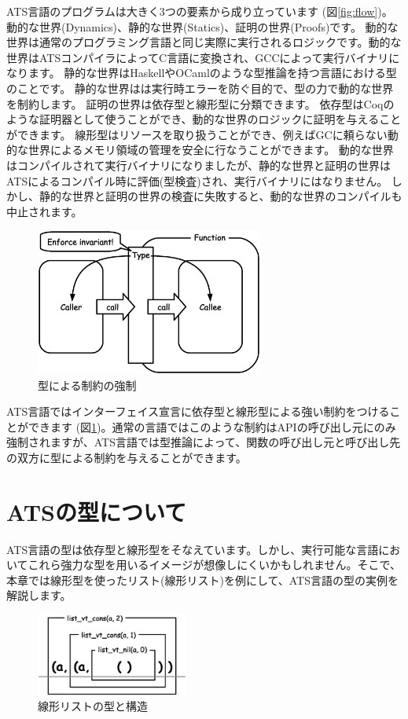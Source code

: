 \documentclass{ipsjprosym}
\begin{document}
ATS言語のプログラムは大きく3つの要素から成り立っています (図\ref{fig:flow})。 動的な世界(Dynamics)、静的な世界(Statics)、証明の世界(Proofs)です。 動的な世界は通常のプログラミング言語と同じ実際に実行されるロジックです。動的な世界はATSコンパイラによってC言語に変換され、GCCによって実行バイナリになります。 静的な世界はHaskellやOCamlのような型推論を持つ言語における型のことです。 静的な世界はは実行時エラーを防ぐ目的で、型の力で動的な世界を制約します。 証明の世界は依存型と線形型に分類できます。 依存型はCoqのような証明器として使うことができ、動的な世界のロジックに証明を与えることができます。 線形型はリソースを取り扱うことができ、例えばGCに頼らない動的な世界によるメモリ領域の管理を安全に行なうことができます。 動的な世界はコンパイルされて実行バイナリになりましたが、静的な世界と証明の世界はATSによるコンパイル時に評価(型検査)され、実行バイナリにはなりません。 しかし、静的な世界と証明の世界の検査に失敗すると、動的な世界のコンパイルも中止されます。

\begin{figure}[h]
\centering
\includegraphics[width=75mm]{draw/enforce_invariant.eps}
\caption{型による制約の強制}
\label{fig:enforce_invariant}
\end{figure}

ATS言語ではインターフェイス宣言に依存型と線形型による強い制約をつけることができます (図\ref{fig:enforce_invariant})。通常の言語ではこのような制約はAPIの呼び出し元にのみ強制されますが、ATS言語では型推論によって、関数の呼び出し元と呼び出し先の双方に型による制約を与えることができます。

\section{ATSの型について}

ATS言語の型は依存型と線形型をそなえています。しかし、実行可能な言語においてこれら強力な型を用いるイメージが想像しにくいかもしれません。そこで、本章では線形型を使ったリスト(線形リスト)を例にして、ATS言語の型の実例を解説します。

\begin{figure}[h]
\centering
\includegraphics[width=50mm]{draw/list_vt_type.eps}
\caption{線形リストの型と構造}
\label{fig:list_vt_type}
\end{figure}
\end{document}

